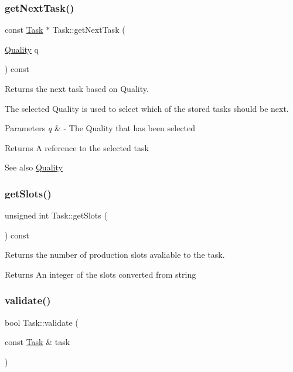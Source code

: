 \subsubsection{\texorpdfstring{get\+Next\+Task()}{getNextTask()}}
{\footnotesize\ttfamily const \mbox{\hyperlink{class_task}{Task}} $\ast$ Task\+::get\+Next\+Task (\begin{DoxyParamCaption}\item[{\mbox{\hyperlink{class_task_a6b8b1fc5858cbd77055e79d6381282fb}{Quality}}}]{q }\end{DoxyParamCaption}) const}



Returns the next task based on Quality. 

The selected Quality is used to select which of the stored tasks should be next. 
\begin{DoxyParams}{Parameters}
{\em q} & -\/ The Quality that has been selected \\
\hline
\end{DoxyParams}
\begin{DoxyReturn}{Returns}
A reference to the selected task 
\end{DoxyReturn}
\begin{DoxySeeAlso}{See also}
\mbox{\hyperlink{class_task_a6b8b1fc5858cbd77055e79d6381282fb}{Quality}} 
\end{DoxySeeAlso}
\mbox{\label{class_task_a67589413dbb0d5ffa3b2f08c6fa461ea}} 
\subsubsection{\texorpdfstring{get\+Slots()}{getSlots()}}
{\footnotesize\ttfamily unsigned int Task\+::get\+Slots (\begin{DoxyParamCaption}{ }\end{DoxyParamCaption}) const}



Returns the number of production slots avaliable to the task. 

\begin{DoxyReturn}{Returns}
An integer of the slots converted from string 
\end{DoxyReturn}
\mbox{\label{class_task_a974eb3143ac070fd67495f3c4a108a96}} 
\subsubsection{\texorpdfstring{validate()}{validate()}}
{\footnotesize\ttfamily bool Task\+::validate (\begin{DoxyParamCaption}\item[{const \mbox{\hyperlink{class_task}{Task}} \&}]{task }\end{DoxyParamCaption})}



